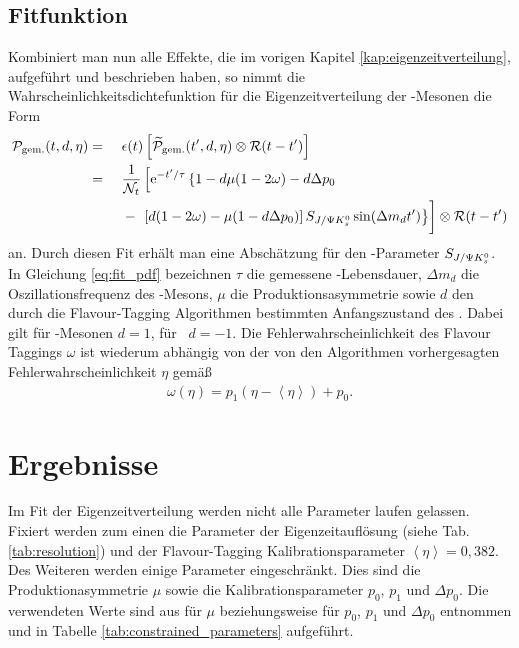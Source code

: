 \subsection{Fitfunktion}
Kombiniert man nun alle Effekte, die im vorigen Kapitel \ref{kap:eigenzeitverteilung}, aufgeführt und beschrieben haben, so nimmt die Wahrscheinlichkeitsdichtefunktion für die Eigenzeitverteilung der \Bd-Mesonen die Form
\begin{alignat}{3}
\nonumber\mathcal{P}_{\text{gem.}}(t, d, \eta) &=\  &&  \epsilon(t)\left[\widetilde{\mathcal{P}}_{\text{gem.}}(t', d, \eta) \otimes \mathcal{R}(t-t')\right]\\
\nonumber &= &&\frac{1}{\mathcal{N}_t}\left[\e^{-t'/\tau} \left\lbrace 1-d\mu(1-2\omega)-d\Delta p_0 \right.\right.\\
& &&-\left.\vphantom{\frac{1}{\mathcal{N}_t}}\left.\left[d(1-2\omega)-\mu(1-d\Delta p_0)\right]\SJPsi\sin(\Delta m_d t')\right\rbrace\right]\otimes\mathcal{R}(t-t') \label{eq:fit_pdf}
\end{alignat}
an. Durch diesen Fit erhält man eine Abschätzung für den \CP-Parameter $S_{J/\Psi K_s^0}$. In Gleichung \ref{eq:fit_pdf} bezeichnen $\tau$ die gemessene \Bd-Lebensdauer, $\Delta m_d$ die Oszillationsfrequenz des \Bd-Mesons, $\mu$ die Produktionsasymmetrie sowie $d$ den durch die Flavour-Tagging Algorithmen bestimmten Anfangszustand des \Bd. Dabei gilt für \Bd-Mesonen $d=1$, für \Bdbar\ $d=-1$. Die Fehlerwahrscheinlichkeit des Flavour Taggings $\omega$ ist wiederum abhängig von der von den Algorithmen vorhergesagten Fehlerwahrscheinlichkeit $\eta$ gemäß
\begin{align}
\omega(\eta) = p_1\left(\eta-\left\langle\eta\right\rangle\right) + p_0.
\end{align}


\section{Ergebnisse} \label{kap:fitergebnis}
Im Fit der Eigenzeitverteilung werden nicht alle Parameter laufen gelassen. Fixiert werden zum einen die Parameter der Eigenzeitauflösung (siehe Tab. \ref{tab:resolution}) und der Flavour-Tagging Kalibrationsparameter $\left\langle\eta\right\rangle = 0,382$. Des Weiteren werden einige Parameter eingeschränkt. Dies sind die Produktionasymmetrie $\mu$ sowie die Kalibrationsparameter $p_0$, $p_1$ und $\Delta p_0$. Die verwendeten Werte sind aus \cite{lhcb-paper} für $\mu$ beziehungsweise \cite{tagging} für $p_0$, $p_1$ und $\Delta p_0$ entnommen und in Tabelle \ref{tab:constrained_parameters} aufgeführt.

